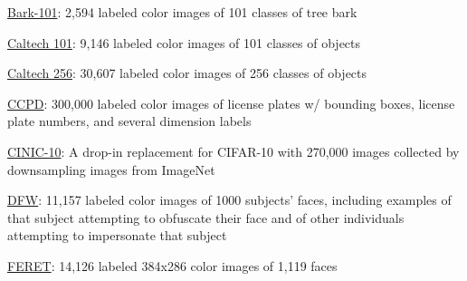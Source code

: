 \documentclass{tufte-handout}
\begin{document}
\bi
\item
  \href{http://eidolon.univ-lyon2.fr/~remi1/Bark-101/}{Bark-101}: 2,594
  labeled color images of 101 classes of tree bark
\item
  \href{http://www.vision.caltech.edu/Image_Datasets/Caltech101/}{Caltech
  101}: 9,146 labeled color images of 101 classes of objects
\item
  \href{http://www.vision.caltech.edu/Image_Datasets/Caltech256/}{Caltech
  256}: 30,607 labeled color images of 256 classes of objects
\item
  \href{https://github.com/detectRecog/CCPD}{CCPD}: 300,000 labeled
  color images of license plates w/ bounding boxes, license plate
  numbers, and several dimension labels
\item
  \href{https://github.com/BayesWatch/cinic-10}{CINIC-10}: A drop-in
  replacement for CIFAR-10 with 270,000 images collected by downsampling
  images from ImageNet
\item
  \href{http://iab-rubric.org/resources/dfw.html}{DFW}: 11,157 labeled
  color images of 1000 subjects' faces, including examples of that
  subject attempting to obfuscate their face and of other individuals
  attempting to impersonate that subject
\item
  \href{https://www.nist.gov/itl/iad/image-group/color-feret-database}{FERET}:
  14,126 labeled 384x286 color images of 1,119 faces
\end{document}
